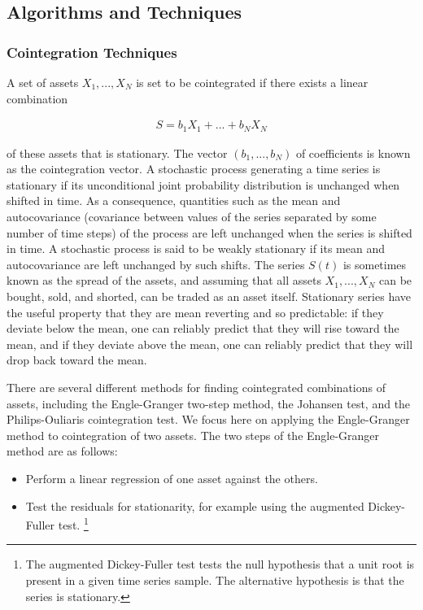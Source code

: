 \documentclass{article}
\begin{document}
\subsection{Algorithms and Techniques}

\subsubsection{Cointegration Techniques}

A set of assets $X_{1}, ... , X_{N}$ is set to be cointegrated if there exists a linear combination 

\begin{align}
S = b_{1} X_{1} + ... + b_{N} X_{N}
\end{align}

\noindent of these assets that is stationary. The vector $(b_{1}, ..., b_{N})$ of coefficients is known as the cointegration vector. A stochastic process generating a time series is stationary if its unconditional joint probability distribution is unchanged when shifted in time. As a consequence, quantities such as the mean and autocovariance (covariance between values of the series separated by some number of time steps) of the process are left unchanged when the series is shifted in time. A stochastic process is said to be weakly stationary if its mean and autocovariance are left unchanged by such shifts. The series $S(t)$ is sometimes known as the spread of the assets, and assuming that all assets $X_{1}, ... , X_{N}$ can be bought, sold, and shorted, can be traded as an asset itself. Stationary series have the useful property that they are mean reverting and so predictable: if they deviate below the mean, one can reliably predict that they will rise toward the mean, and if they deviate above the mean, one can reliably predict that they will drop back toward the mean. 

There are several different methods for finding cointegrated combinations of assets, including the Engle-Granger two-step method, the Johansen test, and the Philips-Ouliaris cointegration test. We focus here on applying the Engle-Granger method to cointegration of two assets. The two steps of the Engle-Granger method are as follows:

\begin{itemize}
\item Perform a linear regression of one asset against the others. 
\item Test the residuals for stationarity, for example using the augmented Dickey-Fuller test.
\footnote{The augmented Dickey-Fuller test tests the null hypothesis that a unit root is present in a given time series sample. The alternative hypothesis is that the series is stationary.
} 
\end{itemize}
\end{document}
